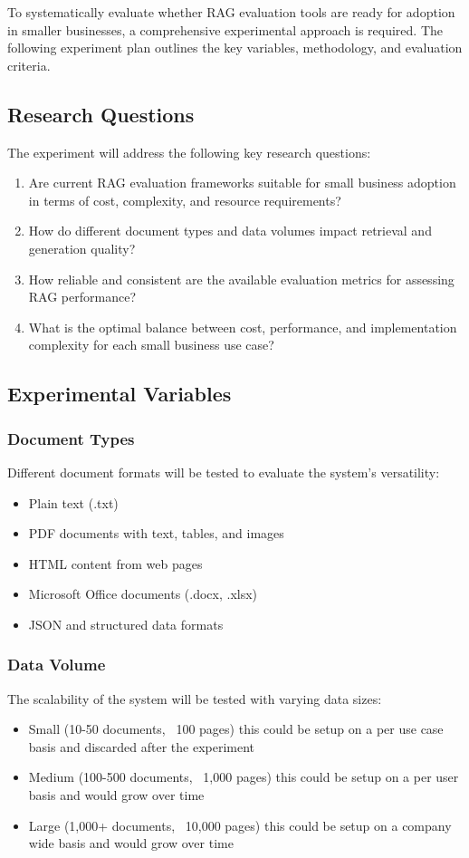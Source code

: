 To systematically evaluate whether RAG evaluation tools are ready for adoption in smaller businesses, a comprehensive experimental approach is required. The following experiment plan outlines the key variables, methodology, and evaluation criteria.

\subsection{Research Questions}

The experiment will address the following key research questions:

\begin{enumerate}
    \item Are current RAG evaluation frameworks suitable for small business adoption in terms of cost, complexity, and resource requirements?
    \item How do different document types and data volumes impact retrieval and generation quality?
    \item How reliable and consistent are the available evaluation metrics for assessing RAG performance?
    \item What is the optimal balance between cost, performance, and implementation complexity for each small business use case?
\end{enumerate}

\subsection{Experimental Variables}

\subsubsection{Document Types}
Different document formats will be tested to evaluate the system's versatility:
\begin{itemize}
    \item Plain text (.txt)
    \item PDF documents with text, tables, and images
    \item HTML content from web pages
    \item Microsoft Office documents (.docx, .xlsx)
    \item JSON and structured data formats
\end{itemize}

\subsubsection{Data Volume}
The scalability of the system will be tested with varying data sizes:
\begin{itemize}
    \item Small (10-50 documents, ~100 pages) this could be setup on a per use case basis and discarded after the experiment
    \item Medium (100-500 documents, ~1,000 pages) this could be setup on a per user basis and would grow over time
    \item Large (1,000+ documents, ~10,000 pages) this could be setup on a company wide basis and would grow over time
\end{itemize}


